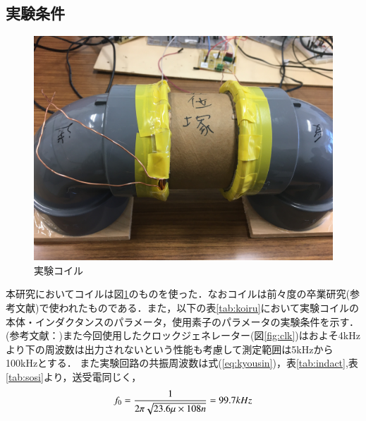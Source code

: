 \documentclass[12pt]{jarticle}
\begin{document}
\subsection{実験条件}
 \begin{figure}[H]
	\centering
	\includegraphics[scale=0.1]{koiru.JPG}
	\caption{実験コイル}
	\label{fig:koiru}
\end{figure}
本研究においてコイルは図\ref{fig:koiru}のものを使った．なおコイルは前々度の卒業研究(参考文献\cite{goizuka})で使われたものである．また，以下の表\ref{tab:koiru}において実験コイルの本体・インダクタンスのパラメータ，使用素子のパラメータの実験条件を示す．(参考文献：\cite{goizuka})また今回使用したクロックジェネレーター(図\ref{fig:clk})はおよそ4kHzより下の周波数は出力されないという性能も考慮して測定範囲は5kHzから100kHzとする．
また実験回路の共振周波数は式(\ref{eq:kyousin})，表\ref{tab:indact},表\ref{tab:sosi}より，送受電同じく，
\begin{equation}
f_0=\frac{1}{2\pi\sqrt{23.6\mu \times 108n}} 
\\=99.7kHz
\label{eq:99.6k}
\end{equation}
\end{document}

